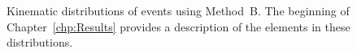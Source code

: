 \begin{figure}[h!]
\caption{Kinematic distributions of \photwojet events using \mbox{Method B}. The beginning of Chapter~\ref{chp:Results} provides a description of the elements in these distributions.}
\label{fig:pjMtdBSetThree}
\end{figure}
\clearpage

